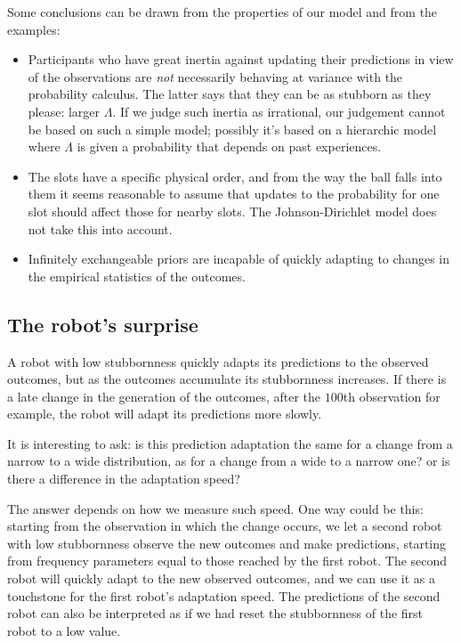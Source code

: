 \documentclass[\ifafour a4paper,12pt,\else a5paper,10pt,\fi%
onecolumn,oneside,article,%
british%
]{memoir}
\theoremstyle{remark}
\theoremstyle{innote}
\renewcommand*{\|}{\mathpunct{|}}
\newcommand*{\yN}{\varLambda}
\begin{document}
Some conclusions can be drawn from the properties of our model and from the
examples:
\begin{itemize}[para]
\item Participants who have great inertia against updating their
  predictions in view of the observations are \emph{not} necessarily
  behaving at variance with the probability calculus. The latter says that
  they can be as stubborn as they please: larger $\yN$. If we judge such
  inertia as irrational, our judgement cannot be based on such a simple
  model; possibly it's based on a hierarchic model where $\yN$ is given a
  probability that depends on past experiences.

\item The slots have a specific physical order, and from the way the ball
  falls into them it seems reasonable to assume that updates to the
  probability for one slot should affect those for nearby slots. The
  Johnson-Dirichlet model does not take this into account. 

\item Infinitely exchangeable priors are incapable of quickly adapting to
  changes in the empirical statistics of the outcomes.
\end{itemize}


\subsection{The robot's surprise}
\label{sec:examples_robot_surprise}

A robot with low stubbornness quickly adapts its predictions to the
observed outcomes, but as the outcomes accumulate its stubbornness
increases. If there is a late change in the generation of the outcomes,
after the $100$th observation for example, the robot will adapt its
predictions more slowly.

It is interesting to ask: is this prediction adaptation the same for a
change from a narrow to a wide distribution, as for a change from a wide to
a narrow one? or is there a difference in the adaptation speed?

The answer depends on how we measure such speed. One way could be this:
starting from the observation in which the change occurs, we let a second
robot with low stubbornness observe the new outcomes and make predictions,
starting from frequency parameters equal to those reached by the first
robot. The second robot will quickly adapt to the new observed outcomes,
and we can use it as a touchstone for the first robot's adaptation speed.
The predictions of the second robot can also be interpreted as if we had
reset the stubbornness of the first robot to a low value.
\end{document}
